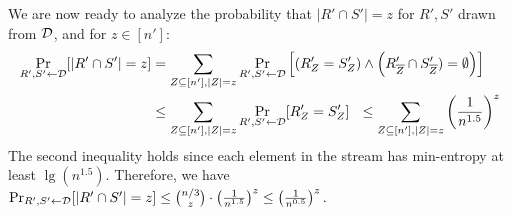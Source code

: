 We are now ready to analyze the probability that $|R' \cap S'| = z$
for $R', S'$ drawn from ${\cal D}$,
and for $z \in [n']$:
\begin{align*}
    \Pr_{R', S' \leftarrow {\cal D}} [|R' \cap S'| = z] 
    &= \sum_{Z \subseteq [n'], |Z| = z} \Pr_{R', S' \leftarrow  {\cal D}} 
    \left [ \left ( R'_{Z} = S'_{Z} \right ) \wedge 
    \left ( R'_{\overline{Z}} \cap S'_{\overline{Z}}) = \emptyset \right ) \right]\\
    &\leq \sum_{Z \subseteq [n'], |Z| = z} \Pr_{R', S' \leftarrow  {\cal D}} [R'_{Z} = S'_{Z}]
    ~~\leq \sum_{Z \subseteq [n'], |Z| = z} \left ( \frac{1}{n^{1.5}} \right )^z
\end{align*}
%
The second inequality holds since each element in the stream has min-entropy at least $\lg (n^{1.5})$.  
Therefore, we have 
$
  \Pr_{R', S' \leftarrow {\cal D}} [|R' \cap S'| = z] 
\le {{n/3} \choose z} \cdot  \left ( \frac{1}{n^{1.5}} \right )^z
   \leq \left ( \frac{1}{n^{0.5}} \right )^z.$